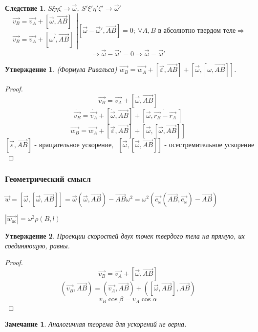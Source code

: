 \documentclass{article}
\renewcommand{\v}[1]{{\vec{#1}}}
\newtheorem{ass}{Утверждение}
\newtheorem*{cor}{Следствие}
\newtheorem*{ntc}{Замечание}
\begin{document}
  \begin{cor}
  $S\xi\eta\zeta \rightarrow \v{\omega}$, $S'\xi'\eta'\zeta' \rightarrow \v{\omega}'$
  $$ 
  \left.
  \begin{array}{ccc}
  \v{v_B} = \v{v_A} + [\v{\omega}, \v{AB}] \\
  \v{v_B} = \v{v_A} + [\v{\omega'}, \v{AB}]
  \end{array}
  \right|
  [\v{\omega} - \v{\omega}', \v{AB}] = 0;~ \forall A, B \text{ в абсолютно твердом теле} \Rightarrow
  $$
  $$ \Rightarrow \v{\omega} - \v{\omega}' = 0 \Rightarrow \boxed{\v{\omega} = \v{\omega}'} $$
  \end{cor}
  
  \begin{ass}(Формула Ривальса) $ \v{w_B} = \v{w_A} + [\v{\varepsilon}, \v{AB}] + [\v{\omega}, [\omega, \v{AB}]] $.
  \end{ass}
  \begin{proof}
  $$ \v{v_B} = \v{v_A} + [\v{\omega}, \v{AB}] $$
  $$ \dot{\v{v_B}} = \dot{\v{v_A}} + [\dot{\v{\omega}}, \v{AB}] + [\v{\omega}, \dot{\v{r_B} - \v{r_A}}~]  $$
  $$ \v{w_B} = \v{w_A} + [\v{\varepsilon}, \v{AB}] + [\v{\omega}, [\v{\omega}, \v{AB}]]  $$
  $$ [\v{\varepsilon}, \v{AB}] \text{ - вращательное ускорение,~~} [\v{\omega}, [\v{\omega}, \v{AB}]] \text{ - осестремительное ускорение} $$ 
  \end{proof}
  
  \subsubsection{Геометрический смысл}
  $ \v{w} = [\v{\omega}, [\v{\omega}, \v{AB}]] = \v{\omega} (\v{\omega}, \v{AB}) - \v{AB} \omega^2 = \omega^2 ( \v{e_{\omega}}(\v{AB}, \v{e_{\omega}}) - \v{AB}) $
  
  $ | \v{w_{\textbf{ос}}} |= \omega^2 \rho(B, l) $
  
  \begin{ass}
  Проекции скоростей двух точек твердого тела на прямую, их соединяющую, равны.
  \end{ass}
  \begin{proof}
  $$ \v{v_B} = \v{v_A} + [\v{\omega}, \v{AB}] $$
  $$ (\v{v_B}, \v{AB}) = (\v{v_A}, \v{AB}) + ([\v{\omega}, \v{AB}], \v{AB}) $$
  $$ v_B \cos \beta = v_A \cos \alpha $$
  \end{proof}
  \begin{ntc}
  Аналогичная теорема для ускорений не верна.
  \end{ntc}
  
\end{document}
